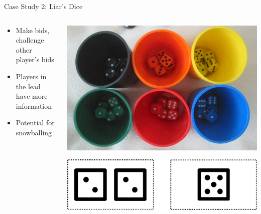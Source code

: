\documentclass[10pt]{beamer}
\begin{document}
\begin{frame}{Case Study 2: Liar's Dice}
\begin{columns}[T] 
\begin{column}{0.5\textwidth}
\begin{itemize}
    \item Make bids, challenge other player's bids
    \item Players in the lead have more information
    \item Potential for snowballing
\end{itemize}
\end{column}
\begin{column}{0.5\textwidth}
\includegraphics[width=\textwidth]{images/Perudo.jpg}

\includegraphics[width=\textwidth]{images/different_information.pdf}
\end{column}
\end{columns}
\end{frame}
\end{document}
